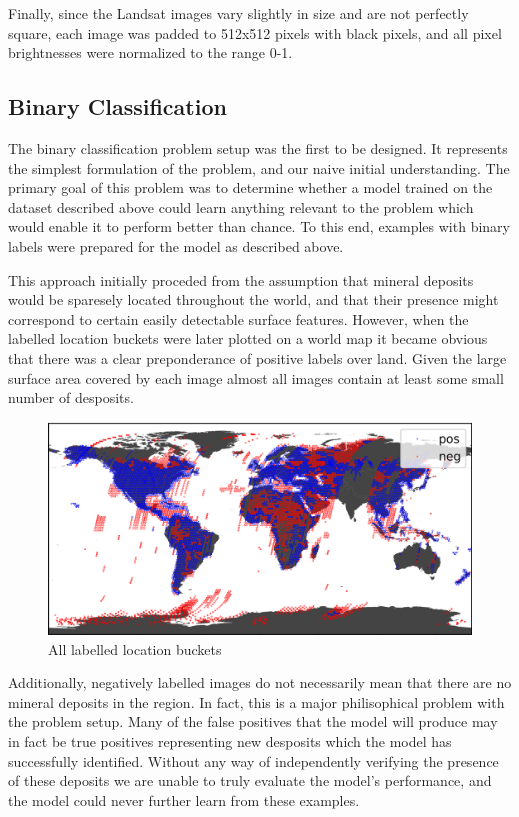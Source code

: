 \documentclass[10pt]{article}
\begin{document}
Finally, since the Landsat images vary slightly in size and are not perfectly square,
each image was padded to 512x512 pixels with black pixels, and all pixel brightnesses
were normalized to the range 0-1. 

\subsection{Binary Classification}

The binary classification problem setup was the first to be designed. It represents
the simplest formulation of the problem, and our naive initial understanding.
The primary goal of this problem was to determine whether a model trained
on the dataset described above could learn anything relevant to the problem which
would enable it to perform better than chance. To this end, examples with binary
labels were prepared for the model as described above. 

This approach initially proceded from the assumption that mineral deposits would
be sparesely located throughout the world, and that their presence might correspond
to certain easily detectable surface features. However, when the labelled location
buckets were later plotted on a world map it became obvious that there was
a clear preponderance of positive labels over land. Given the large surface area
covered by each image almost all images contain at least some small number of desposits. 

\begin{figure}[ht]
  \centering
  \includegraphics[width=0.75\linewidth]{locations.png}
  \caption{All labelled location buckets}
  \label{fig:locations}
\end{figure}

Additionally, negatively labelled images do not necessarily mean that there are
no mineral deposits in the region. In fact, this is a major philisophical problem
with the problem setup. Many of the false positives that the model will produce
may in fact be true positives representing new desposits which the model has
successfully identified. Without any way of independently verifying the 
presence of these deposits we are unable to truly evaluate the model's performance,
and the model could never further learn from these examples.
\end{document}
